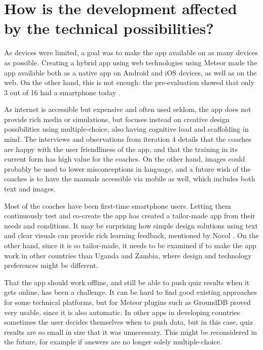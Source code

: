 \section{How is the development affected by the technical possibilities?}

As devices were limited, a goal was to make the app available on as many devices as possible. Creating a hybrid app using web technologies using Meteor made the app available both as a native app on Android and iOS devices, as well as on the web. On the other hand, this is not enough: the pre-evaluation showed that only 3 out of 16 had a smartphone today \cite{youngdrive-statistics}.

As internet is accessible but expensive and often used seldom, the app does not provide rich media or simulations, but focuses instead on creative design possibilities using multiple-choice, also having cognitive load and scaffolding in mind. The interviews and observations from iteration 4 details that the coaches are happy with the user friendliness of the app, and that the training in its current form has high value for the coaches. On the other hand, images could probably be used to lower misconceptions in language, and a future wish of the coaches is to have the manuals accessible via mobile as well, which includes both text and images.

Most of the coaches have been first-time smartphone users. Letting them continuously test and co-create the app has created a tailor-made app from their needs and conditions. It may be surprising how simple design solutions using text and clear visuals can provide rich learning feedback, mentioned by Nocol \cite{nicol}. On the other hand, since it is so tailor-made, it needs to be examined if to make the app work in other countries than Uganda and Zambia, where design and technology preferences might be different.

That the app should work offline, and still be able to push quiz results when it gets online, has been a challenge. It can be hard to find good existing approaches for some technical platforms, but for Meteor plugins such as GroundDB proved very usable, since it is also automatic. In other apps in developing countries sometimes the user decides themselves when to push data, but in this case, quiz results are so small in size that it was unnecessary. This might be reconsidered in the future, for example if answers are no longer solely multiple-choice.

